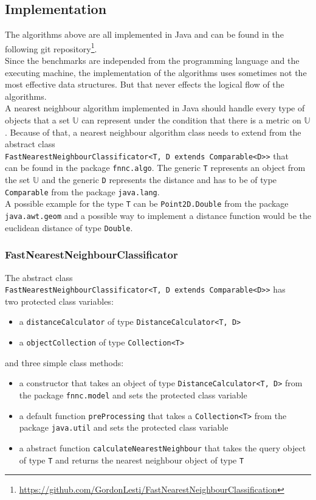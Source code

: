 \documentclass[runningheads,a4paper]{llncs}
\begin{document}
\subsection{Implementation}

The algorithms above are all implemented in Java and can be found in the following git
repository\footnote[1]{\url{https://github.com/GordonLesti/FastNearestNeighbourClassification}}.\\
Since the benchmarks are independed from the programming language and the executing machine, the implementation of the
algorithms uses sometimes not the most effective data structures. But that never effects the logical flow of the
algorithms.\\

A nearest neighbour algorithm implemented in Java should handle every type of objects that a set $\mathbb{U}$ can
represent under the condition that there is a metric on $\mathbb{U}$. Because of that, a nearest neighbour algorithm
class needs to extend from the abstract class\\ \verb+FastNearestNeighbourClassificator<T, D extends Comparable<D>>+
that\\ can be found in the package \verb+fnnc.algo+. The generic \verb+T+ represents an object from the set $\mathbb{U}$
and the generic \verb+D+ represents the distance and has to be of type \verb+Comparable+ from the package
\verb+java.lang+.\\

A possible example for the type \verb+T+ can be \verb+Point2D.Double+ from the package
\verb+java.awt.geom+ and a possible way to implement a distance function would be the euclidean distance of type
\verb+Double+.

\subsubsection{FastNearestNeighbourClassificator}

The abstract class\\ \verb+FastNearestNeighbourClassificator<T, D extends Comparable<D>>+ has\\ two protected class
variables:
\begin{itemize}
	\item a \verb+distanceCalculator+ of type \verb+DistanceCalculator<T, D>+
	\item a \verb+objectCollection+ of type \verb+Collection<T>+
\end{itemize}
and three simple class methods:
\begin{itemize}
	\item a constructor that takes an object of type \verb+DistanceCalculator<T, D>+ from the package
		\verb+fnnc.model+ and sets the protected class variable
	\item a default function \verb+preProcessing+ that takes a \verb+Collection<T>+ from the package
		\verb+java.util+ and sets the protected class variable
	\item a abstract function \verb+calculateNearestNeighbour+ that takes the query object of type \verb+T+ and
		returns the nearest neighbour object of type \verb+T+
\end{itemize}
\end{document}
